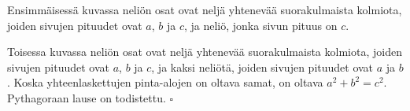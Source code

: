 Ensimmäisessä kuvassa neliön osat ovat neljä yhtenevää suorakulmaista kolmiota, joiden
sivujen pituudet ovat $a$, $b$ ja $c$, ja neliö, jonka sivun pituus on $c$.

Toisessa kuvassa neliön osat ovat neljä yhtenevää suorakulmaista kolmiota, joiden
sivujen pituudet ovat $a$, $b$ ja $c$, ja kaksi neliötä, joiden sivujen pituudet ovat $a$ ja $b$.
Koska yhteenlaskettujen pinta-alojen on oltava samat, on oltava $a^2 + b^2 = c^2$.
Pythagoraan lause on todistettu. $\square $
